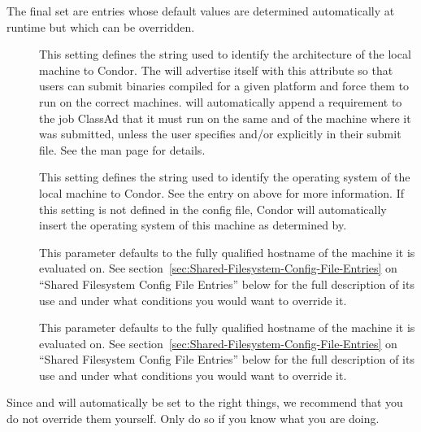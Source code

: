 The final set are entries whose default values are determined
automatically at runtime but which can be overridden.  
\begin{description}

\item[] \label{param:Arch} This setting defines the string
  used to identify the architecture of the local machine to Condor.
  The  will advertise itself with this attribute so
  that users can submit binaries compiled for a given platform and
  force them to run on the correct machines.   will
  automatically append a requirement to the job ClassAd that it must
  run on the same  and  of the machine where
  it was submitted, unless the user specifies  and/or
   explicitly in their submit file.  See the
   man page for details.  

\item[] \label{param:OpSys} This setting defines the
  string used to identify the operating system of the local machine to
  Condor.  See the entry on  above for more information.
  If this setting is not defined in the config file, Condor will
  automatically insert the operating system of this machine as
  determined by.  

\item[] This parameter defaults to the fully
  qualified hostname of the machine it is evaluated on.  See
  section~\ref{sec:Shared-Filesystem-Config-File-Entries} on ``Shared
  Filesystem Config File Entries'' below for the full description of
  its use and under what conditions you would want to override it.

\item[] This parameter defaults to the fully
  qualified hostname of the machine it is evaluated on.  See
  section~\ref{sec:Shared-Filesystem-Config-File-Entries} on ``Shared
  Filesystem Config File Entries'' below for the full description of
  its use and under what conditions you would want to override it.

\end{description}

Since  and  will automatically be set to the
right things, we recommend that you do not override them yourself.
Only do so if you know what you are doing.
  

